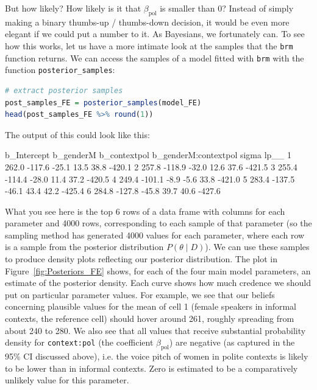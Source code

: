 \documentclass[nobib]{tufte-handout}
\begin{document}
But how likely? How likely is it that $\beta_{\text{pol}}$ is smaller than 0? Instead of simply making a binary thumbs-up / thumbs-down decision, it would be even more elegant if we could put a number to it. As Bayesians, we fortunately can. To see how this works, let us have a more intimate look at the samples that the \texttt{brm} function returns. We can access the samples of a model fitted with \texttt{brm} with the function \texttt{posterior\_samples}:

\bigskip

\begin{minipage}[]{\textwidth}
\begin{lstlisting}[language=R]
# extract posterior samples 
post_samples_FE = posterior_samples(model_FE)
head(post_samples_FE %>% round(1))
\end{lstlisting}
\end{minipage}

The output of this could look like this:

\bigskip

\begin{minipage}[]{1.2\textwidth}
\begin{rc}
  b_Intercept b_genderM b_contextpol b_genderM:contextpol sigma   lp__
1       262.0    -117.6        -25.1                 13.5  38.8 -420.1
2       257.8    -118.9        -32.0                 12.6  37.6 -421.5
3       255.4    -114.4        -28.0                 11.4  37.2 -420.5
4       249.4    -101.1         -8.9                 -5.6  33.8 -421.0
5       283.4    -137.5        -46.1                 43.4  42.2 -425.4
6       284.8    -127.8        -45.8                 39.7  40.6 -427.6
\end{rc}
\end{minipage}

What you see here is the top 6 rows of a data frame with columns for each parameter and 4000 rows, corresponding to each sample of that parameter (so the sampling method has generated 4000 values for each parameter, where each row is a sample from the posterior distribution $P(\theta \mid D)$).
%
%
We can use these samples to produce density plots reflecting our posterior distribution. The plot in Figure~\ref{fig:Posteriors_FE}
shows, for each of the four main model parameters, an estimate of the posterior density. Each
curve shows how much credence we should put on particular parameter values. For example, we see
that our beliefs concerning plausible values for the mean of cell 1 (female speakers in informal
contexts, the reference cell) should hover around 261, roughly spreading from about 240 to 280.
We also see that all values that receive substantial probability density for \texttt{context:pol} (the coefficient $\beta_{\text{pol}}$) are negative (as captured in the 95\% CI discussed above), i.e. the voice pitch of women in polite contexts is likely to be lower than in informal contexts. Zero is estimated to be a comparatively unlikely value for this parameter.
\end{document}
